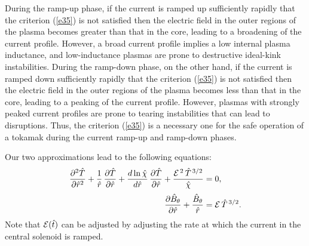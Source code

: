 \documentclass[12pt,prb,aps]{revtex4-1}
\begin{document}
During the ramp-up phase, if the current is ramped up sufficiently rapidly that the criterion (\ref{e35}) is not satisfied then the electric field in the outer regions of the plasma becomes
greater than that in the core, leading to a broadening of the current profile. However, a broad current profile implies a low internal plasma inductance,
and low-inductance plasmas are prone to destructive ideal-kink instabilities.\cite{wesson,cheng} 
During the ramp-down phase, on the other hand, if the current is ramped down sufficiently rapidly that the criterion (\ref{e35}) is not satisfied then the electric field in the outer regions of the plasma becomes
less than that in the core, leading to a peaking of the current profile. However, plasmas with strongly peaked current profiles are prone to tearing instabilities
that can lead to disruptions.\cite{wesson,cheng} Thus, the criterion (\ref{e35}) is a necessary one for  the safe operation of a tokamak during the
current ramp-up and ramp-down phases. 

Our two approximations lead to the following equations:
\begin{align}\label{e38}
\frac{\partial^2\hat{T}}{\partial \hat{r}^2} 
 +\frac{1}{\hat{r}}\,\frac{\partial\hat{T}}{\partial\hat{r}} + \frac{d\ln\hat{\chi}}{d\hat{r}}\,\frac{\partial\hat{T}}{\partial\hat{r}}
 + \frac{{\cal E}^{\,2}\,\hat{T}^{\,3/2}}{\hat{\chi}}&=0,\\[0.5ex]
 \frac{\partial\hat{B}_\theta}{\partial \hat{r}} + \frac{\hat{B}_\theta}{\hat{r}}&= {\cal E}\,\hat{T}^{\,3/2}.\label{e39}
\end{align}
Note that ${\cal E}(\hat{t})$ can be adjusted by adjusting the rate at which the current in the central solenoid is ramped. 
\end{document}
